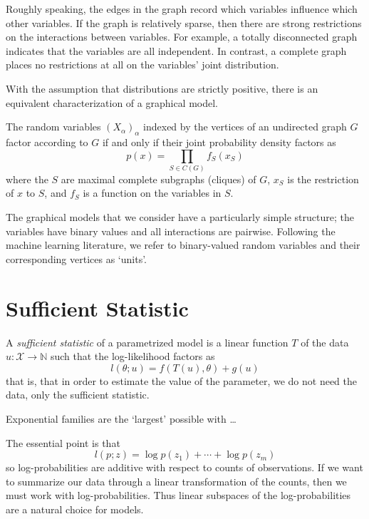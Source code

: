 \documentclass[cclicense]{hmcthesis}
\providecommand*{\xs}{\mathcal X}
\providecommand*{\N}{\mathbb{N}}
\numberwithin{equation}{chapter}
\numberwithin{thmcounter}{chapter}
\begin{document}
    Roughly speaking, the edges in the graph record which variables influence
    which other variables.  If the graph is relatively sparse, then there are
    strong restrictions on the interactions between variables.  For example, a
    totally disconnected graph indicates that the variables are all independent.
    In contrast, a complete graph places no restrictions at all on the
    variables' joint distribution.
    
    With the assumption that distributions are strictly positive, there is an
    equivalent characterization of a graphical model.

    \begin{theorem}
        The random variables $(X_\alpha)_\alpha$ indexed by the vertices of an
        undirected graph $G$ factor according to $G$ if and only if their
        joint probability density factors as
        \[
            p(x) = \prod_{S \in C(G)} f_S(x_S)
        \]
        where the $S$ are maximal complete subgraphs (cliques) of $G$, $x_S$ is
        the restriction of $x$ to $S$, and $f_S$ is a function on the variables in
        $S$.
    \end{theorem}

    The graphical models that we consider have a particularly simple structure;
    the variables have binary values and all interactions are pairwise.
    Following the machine learning literature, we refer to binary-valued random
    variables and their corresponding vertices as `units'.

\section{Sufficient Statistic}
    \begin{definition}
        A \emph{sufficient statistic} of a parametrized model is a linear
        function $T$ of the data $u : \xs \to \N$ such that the log-likelihood
        factors as
        \[
            l(\theta; u) = f(T(u), \theta) + g(u)
        \]
        that is, that in order to estimate the value of the parameter, we do not
        need the data, only the sufficient statistic.
    \end{definition}

    \begin{theorem}
        Exponential families are the `largest' possible with \ldots
    \end{theorem}

    The essential point is that
    \[
        l(p; z) = \log p(z_1) + \cdots + \log p(z_m) 
    \]
    so log-probabilities are additive with respect to counts of observations.
    If we want to summarize our data through a linear transformation of the
    counts, then we must work with log-probabilities.  Thus linear subspaces of
    the log-probabilities are a natural choice for models.


\backmatter




\end{document}
